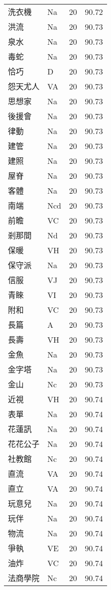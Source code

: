 \documentclass[twocolumn]{book}
\begin{document}
\begin{supertabular}{llrr}
洗衣機 & Na & 20 &  90.72\\
洪流 & Na & 20 &  90.73\\
泉水 & Na & 20 &  90.73\\
毒蛇 & Na & 20 &  90.73\\
恰巧 & D & 20 &  90.73\\
怨天尤人 & VA & 20 &  90.73\\
思想家 & Na & 20 &  90.73\\
後援會 & Na & 20 &  90.73\\
律動 & Na & 20 &  90.73\\
建管 & Na & 20 &  90.73\\
建照 & Na & 20 &  90.73\\
屋脊 & Na & 20 &  90.73\\
客體 & Na & 20 &  90.73\\
南端 & Ncd & 20 &  90.73\\
前瞻 & VC & 20 &  90.73\\
剎那間 & Nd & 20 &  90.73\\
保暖 & VH & 20 &  90.73\\
保守派 & Na & 20 &  90.73\\
信服 & VJ & 20 &  90.73\\
青睞 & VI & 20 &  90.73\\
附和 & VC & 20 &  90.73\\
長篇 & A & 20 &  90.73\\
長壽 & VH & 20 &  90.73\\
金魚 & Na & 20 &  90.73\\
金字塔 & Na & 20 &  90.73\\
金山 & Nc & 20 &  90.73\\
近視 & VH & 20 &  90.74\\
表單 & Na & 20 &  90.74\\
花蓮訊 & Na & 20 &  90.74\\
花花公子 & Na & 20 &  90.74\\
社教館 & Nc & 20 &  90.74\\
直流 & VA & 20 &  90.74\\
直立 & VA & 20 &  90.74\\
玩意兒 & Na & 20 &  90.74\\
玩伴 & Na & 20 &  90.74\\
物流 & Na & 20 &  90.74\\
爭執 & VE & 20 &  90.74\\
油炸 & VC & 20 &  90.74\\
法商學院 & Nc & 20 &  90.74\\

\end{supertabular}
\end{document}
